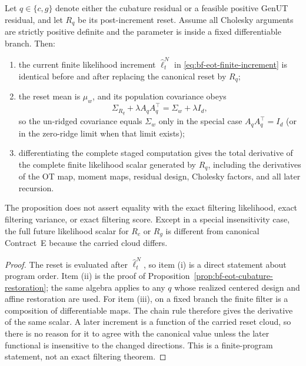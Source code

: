 \begin{proposition}
\label{prop:bf-eot-both-residual-boundary}
Let \(q\in\{c,g\}\) denote either the cubature residual or a feasible positive
GenUT residual, and let \(R_q\) be its post-increment reset.  Assume all
Cholesky arguments are strictly positive definite and the parameter is inside
a fixed differentiable branch.  Then:
\begin{enumerate}[label=(\roman*)]
\item the current finite likelihood increment \(\widehat\ell_t^N\) in
\eqref{eq:bf-eot-finite-increment} is identical before and after replacing the
canonical reset by \(R_q\);
\item the reset mean is \(\mu_w\), and its population covariance obeys
\[
\Sigma_{R_q}+\lambda A_qA_q^\top=\Sigma_w+\lambda I_d,
\]
so the un-ridged covariance equals \(\Sigma_w\) only in the special case
\(A_qA_q^\top=I_d\) (or in the zero-ridge limit when that limit exists);
\item differentiating the complete staged computation gives the total
derivative of the complete finite likelihood scalar generated by \(R_q\),
including the derivatives of the OT map, moment maps, residual design,
Cholesky factors, and all later recursion.
\end{enumerate}
The proposition does not assert equality with the exact filtering likelihood,
exact filtering variance, or exact filtering score.  Except in a special
insensitivity case, the full future likelihood scalar for \(R_c\) or \(R_g\) is
different from canonical Contract~E because the carried cloud differs.
\end{proposition}

\begin{proof}
The reset is evaluated after \(\widehat\ell_t^N\), so item (i) is a direct
statement about program order.  Item (ii) is the proof of
Proposition~\ref{prop:bf-eot-cubature-restoration}; the same algebra applies to
any \(q\) whose realized centered design and affine restoration are used.  For
item (iii), on a fixed branch the finite filter is a composition of
differentiable maps.  The chain rule therefore gives the derivative of the
same scalar.  A later increment is a function of the carried reset cloud, so
there is no reason for it to agree with the canonical value unless the later
functional is insensitive to the changed directions.  This is a finite-program
statement, not an exact filtering theorem.
\end{proof}


